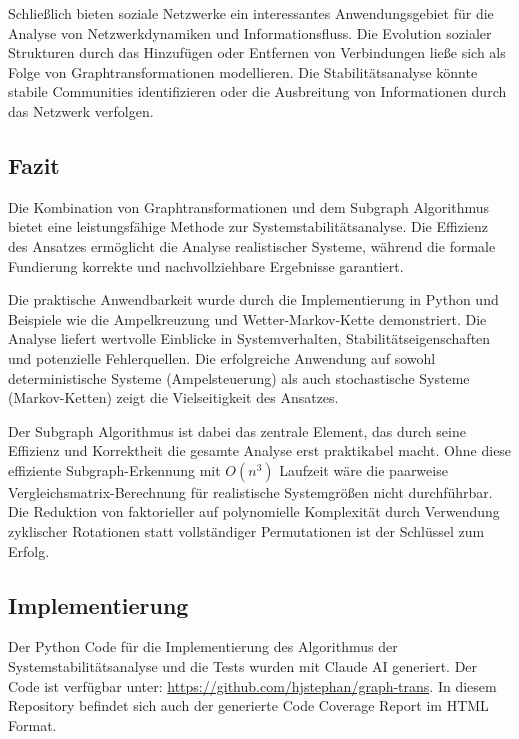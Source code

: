 \documentclass[a4paper,12pt]{article}
\theoremstyle{definition}
\begin{document}
Schließlich bieten soziale Netzwerke ein interessantes Anwendungsgebiet für die Analyse von Netzwerkdynamiken und Informationsfluss. Die Evolution sozialer Strukturen durch das Hinzufügen oder Entfernen von Verbindungen ließe sich als Folge von Graphtransformationen modellieren. Die Stabilitätsanalyse könnte stabile Communities identifizieren oder die Ausbreitung von Informationen durch das Netzwerk verfolgen.

\subsection{Fazit}

Die Kombination von Graphtransformationen und dem Subgraph Algorithmus bietet eine leistungsfähige Methode zur Systemstabilitätsanalyse. Die Effizienz des Ansatzes ermöglicht die Analyse realistischer Systeme, während die formale Fundierung korrekte und nachvollziehbare Ergebnisse garantiert.

Die praktische Anwendbarkeit wurde durch die Implementierung in Python und Beispiele wie die Ampelkreuzung und Wetter-Markov-Kette demonstriert. Die Analyse liefert wertvolle Einblicke in Systemverhalten, Stabilitätseigenschaften und potenzielle Fehlerquellen. Die erfolgreiche Anwendung auf sowohl deterministische Systeme (Ampelsteuerung) als auch stochastische Systeme (Markov-Ketten) zeigt die Vielseitigkeit des Ansatzes.

Der Subgraph Algorithmus ist dabei das zentrale Element, das durch seine Effizienz und Korrektheit die gesamte Analyse erst praktikabel macht. Ohne diese effiziente Subgraph-Erkennung mit $O(n^3)$ Laufzeit wäre die paarweise Vergleichsmatrix-Berechnung für realistische Systemgrößen nicht durchführbar. Die Reduktion von faktorieller auf polynomielle Komplexität durch Verwendung zyklischer Rotationen statt vollständiger Permutationen ist der Schlüssel zum Erfolg.

\subsection{Implementierung}

Der Python Code für die Implementierung des Algorithmus der Systemstabilitätsanalyse und die Tests wurden mit Claude AI generiert. Der Code ist verfügbar unter: \url{https://github.com/hjstephan/graph-trans}. In diesem Repository befindet sich auch der generierte Code Coverage Report im HTML Format.
\end{document}
